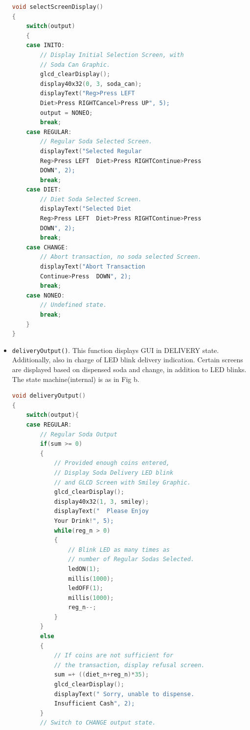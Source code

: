 \documentclass{article}
\begin{document}
\begin{itemize}
      \begin{lstlisting}[basicstyle = \small, language = C]
void selectScreenDisplay()
{
    switch(output)
    {
    case INITO:
        // Display Initial Selection Screen, with 
        // Soda Can Graphic.
        glcd_clearDisplay();
        display40x32(0, 3, soda_can);
        displayText("Reg>Press LEFT  
        Diet>Press RIGHTCancel>Press UP", 5);
        output = NONEO;
        break;
    case REGULAR:
        // Regular Soda Selected Screen.
        displayText("Selected Regular                
        Reg>Press LEFT  Diet>Press RIGHTContinue>Press
        DOWN", 2);
        break;
    case DIET:
        // Diet Soda Selected Screen.
        displayText("Selected Diet                   
        Reg>Press LEFT  Diet>Press RIGHTContinue>Press
        DOWN", 2);
        break;
    case CHANGE:
        // Abort transaction, no soda selected Screen.
        displayText("Abort Transaction                
        Continue>Press  DOWN", 2);
        break;
    case NONEO:
        // Undefined state.
        break;
    }
}
  \end{lstlisting}
  \item \texttt{deliveryOutput()}. This function displays GUI in DELIVERY state. Additionally, also in charge of LED blink delivery indication. Certain screens are displayed based on dispensed soda and change, in addition to LED blinks. The state machine(internal) is as in Fig b.
      \begin{lstlisting}[basicstyle = \small, language = C]
void deliveryOutput()
{
    switch(output){
    case REGULAR:
        // Regular Soda Output
        if(sum >= 0)
        {
            // Provided enough coins entered, 
            // Display Soda Delivery LED blink 
            // and GLCD Screen with Smiley Graphic.
            glcd_clearDisplay();
            display40x32(1, 3, smiley);
            displayText("  Please Enjoy     
            Your Drink!", 5);
            while(reg_n > 0)
            {
                // Blink LED as many times as 
                // number of Regular Sodas Selected.
                ledON(1);
                millis(1000);
                ledOFF(1);
                millis(1000);
                reg_n--;
            }
        }
        else
        {
            // If coins are not sufficient for 
            // the transaction, display refusal screen.
            sum =+ ((diet_n+reg_n)*35);
            glcd_clearDisplay();
            displayText(" Sorry, unable to dispense.
            Insufficient Cash", 2);
        }
        // Switch to CHANGE output state.

\end{lstlisting}
\end{itemize}
\end{document}

